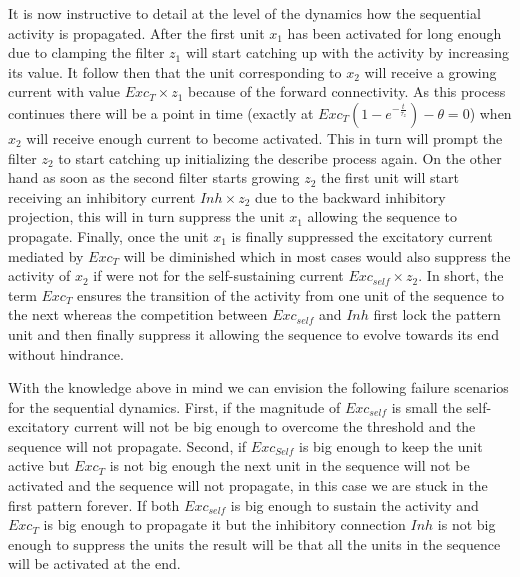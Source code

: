 \documentclass{esannV2}
\begin{document}

It is now instructive to detail at the level of the dynamics how the sequential activity is propagated. After the first unit $x_1$ has been activated for long enough due to clamping the filter $z_1$ will start catching up with the activity by increasing its value. It follow then that the unit corresponding to $x_2$ will receive a growing current with value $Exc_{T} \times z_1$ because of the forward connectivity. As this process continues there will be a point in time (exactly at $Exc_{T}(1 - e^{-\frac{t}{\tau_z}}) - \theta = 0$) when $x_2$ will receive enough current to become activated. This in turn will prompt the filter $z_2$ to start catching up initializing the describe process again. On the other hand as soon as the second filter starts growing $z_2$ the first unit will start receiving an inhibitory current $Inh \times z_2$ due to the backward inhibitory projection, this will in turn suppress the unit $x_1$ allowing the sequence to propagate. Finally, once the unit $x_1$ is finally suppressed the excitatory current mediated by $Exc_T$ will be diminished which in most cases would also suppress the activity of $x_2$ if were not for the self-sustaining current $Exc_{self} \times z_2$. In short, the term $Exc_T$ ensures the transition of the activity from one unit of the sequence to the next whereas the competition between $Exc_{self}$ and $Inh$ first lock the pattern unit and then finally suppress it allowing the sequence to evolve towards its end without hindrance.

With the knowledge above in mind we can envision the following  failure scenarios for the sequential dynamics. First, if the magnitude of $Exc_{self}$ is small the self-excitatory current will not be big enough to overcome the threshold and the sequence will not propagate. Second, if $Exc_{Self}$ is big enough to keep the unit active but $Exc_{T}$ is not big enough the next unit in the sequence will not be activated and the sequence will not propagate, in this case we are stuck in the first pattern forever. If both $Exc_{self}$ is big enough to sustain the activity and $Exc_{T}$ is big enough to propagate it but the inhibitory connection $Inh$ is not big enough to suppress the units the result will be that all the units in the sequence will be activated at the end. 
\end{document}
